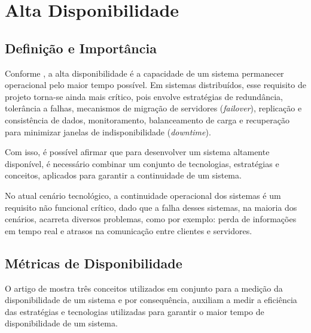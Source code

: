     
\section{Alta Disponibilidade}

    \subsection{Definição e Importância}
    
        Conforme , a alta disponibilidade é a capacidade de um sistema permanecer operacional pelo maior tempo possível. Em sistemas distribuídos, esse requisito de projeto torna-se ainda mais crítico, pois envolve estratégias de redundância, tolerância a falhas, mecanismos de migração de servidores (\textit{failover}), replicação e consistência de dados, monitoramento, balanceamento de carga e recuperação para minimizar janelas de indisponibilidade (\textit{downtime}).

        Com isso, é possível afirmar que para desenvolver um sistema altamente disponível, é necessário combinar um conjunto de tecnologias, estratégias e conceitos, aplicados para garantir a continuidade de um sistema.
        
        No atual cenário tecnológico, a continuidade operacional dos sistemas é um requisito não funcional crítico, dado que a falha desses sistemas, na maioria dos cenários, acarreta diversos problemas, como por exemplo: perda de informações em tempo real e atrasos na comunicação entre clientes e servidores.

    \subsection{Métricas de Disponibilidade} 

        O artigo de  mostra três conceitos utilizados em conjunto para a medição da disponibilidade de um sistema e por consequência, auxiliam a medir a eficiência das estratégias e tecnologias utilizadas para garantir o maior tempo de disponibilidade de um sistema.
        
